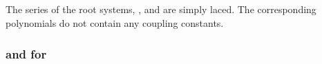 \documentclass[a4paper,12pt]{article}
\begin{document}
\subsection{\coordHE{}}

The \coordHE{} series of the root systems, \coordHE{}, \coordHE{} and \coordHE{} are simply laced.
The corresponding polynomials do not contain any coupling constants.

\subsubsection{\coordHE{} and \myHighlight{$\Delta$}\coordHE{} for \coordHE{}}
\end{document}
